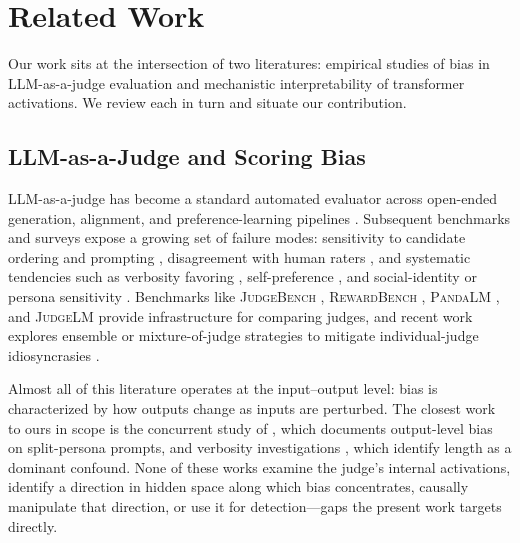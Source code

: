 \documentclass[11pt]{article}
\begin{document}
\section{Related Work}
\label{app:related_work}

Our work sits at the intersection of two literatures: empirical studies of bias in LLM-as-a-judge evaluation and mechanistic interpretability of transformer activations. We review each in turn and situate our contribution.

\subsection{LLM-as-a-Judge and Scoring Bias}
\label{app:related_bias}

LLM-as-a-judge has become a standard automated evaluator across open-ended generation, alignment, and preference-learning pipelines \citep{zheng2023judging,liu2023geval,wang2024pandalm,kim2024prometheus,zhu2024judgelm,gu2024survey,li2024llmsjudges}. Subsequent benchmarks and surveys expose a growing set of failure modes: sensitivity to candidate ordering and prompting \citep{wang2023large,zeng2024evaluating,koo2024benchmarking,ye2024justice}, disagreement with human raters \citep{chen2024humans,shi2024judging,stureborg2024large}, and systematic tendencies such as verbosity favoring \citep{saito2023verbosity,dubois2024length}, self-preference \citep{panickssery2024llm,wataoka2024self}, and social-identity or persona sensitivity \citep{li2024split,thakur2024judging}. Benchmarks like \textsc{JudgeBench} \citep{tan2024judgebench}, \textsc{RewardBench} \citep{lambert2024rewardbench}, \textsc{PandaLM} \citep{wang2024pandalm}, and \textsc{JudgeLM} \citep{zhu2024judgelm} provide infrastructure for comparing judges, and recent work explores ensemble or mixture-of-judge strategies to mitigate individual-judge idiosyncrasies \citep{verga2024replacing,li2025preference,lai2025beyond}.

Almost all of this literature operates at the input--output level: bias is characterized by how outputs change as inputs are perturbed. The closest work to ours in scope is the concurrent study of \citet{li2024split}, which documents output-level bias on split-persona prompts, and verbosity investigations \citep{saito2023verbosity,dubois2024length}, which identify length as a dominant confound. None of these works examine the judge's internal activations, identify a direction in hidden space along which bias concentrates, causally manipulate that direction, or use it for detection---gaps the present work targets directly.
\end{document}
